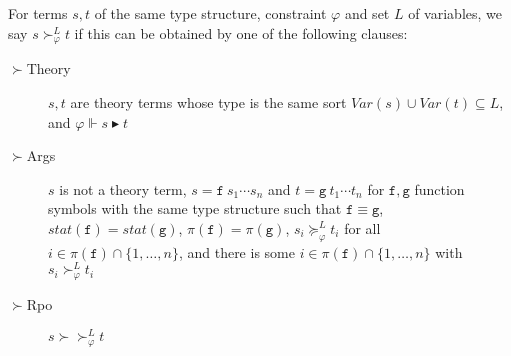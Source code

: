 \documentclass[a4paper,USenglish,cleveref,autoref,thm-restate]{lipics-v2021}
\newcommand{\Var}{\mathit{Var}}
\newcommand{\gtvA}{L}
\newcommand{\geqth}{\succeq_\varphi^\gtvA}
\newcommand{\grth}{\succ_\varphi^\gtvA}
\newcommand{\rpoth}{\succ\!\!\!\succ_\varphi^\gtvA}
\newcommand{\eqpred}{\equiv}
\newcommand{\grsort}{\blacktriangleright}
\newcommand{\symb}[1]{\mathtt{#1}}
\newcommand{\afun}{\symb{f}}
\newcommand{\bfun}{\symb{g}}
\newcommand{\status}{\mathit{stat}}
\newcommand{\filter}{\pi}
\begin{document}
For terms $s,t$ of the same type structure, constraint $\varphi$ and set $\gtvA$ of variables, we
say $s \grth t$ if this can be obtained by one of the following clauses:
\begin{description}
\item[$\succ$Theory] $s,t$ are theory terms whose type is the same sort
  $\Var(s) \cup \Var(t) \subseteq \gtvA$,
  and $\varphi \Vdash s \grsort t$
\item[$\succ$Args] $s$ is not a theory term,
  $s = \afun\ s_1 \cdots s_n$ and $t = \bfun\ t_1 \cdots t_n$ for $\afun,\bfun$
  function symbols with the same type structure such that $\afun \eqpred \bfun$,
  $\status(\afun) = \status(\bfun)$,
  $\filter(\afun) = \filter(\bfun)$, $s_i \geqth t_i$ for all $i \in \filter(\afun) \cap
  \{1,\dots,n\}$, and there is some $i \in \filter(\afun) \cap \{1,\dots,n\}$ with
  $s_i \grth t_i$
\item[$\succ$Rpo] $s \rpoth t$
\end{description}
\end{document}
